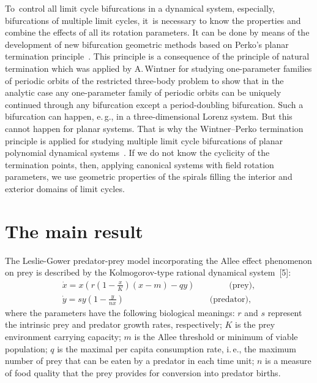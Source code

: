 \documentclass[12pt]{llncs}
\begin{document}
To~control all limit cycle bifurcations in a dynamical system,
especially, bifurcations of multiple limit cycles, it~is necessary to know the properties and
combine the effects of all its rotation parameters. It can be done by means of the development
of new bifurcation geometric methods based on Perko's planar termination principle~\cite{gaiko1}.
This principle is a consequence of the principle of natural termination which was applied
by A.\,Wintner for studying one-parameter families of periodic orbits of the restricted
three-body problem to show that in the analytic case any one-parameter family of periodic
orbits can be uniquely continued through any bifurcation except a period-doubling bifurcation.
Such a bifurcation can happen, e.\,g., in a three-dimensional Lorenz system. But this cannot
happen for planar systems. That is why the Wintner--Perko termination principle is applied
for studying multiple limit cycle bifurcations of planar polynomial dynamical
systems~\cite{gaiko1}. If we do not know the cyclicity of the termination points,
then, applying canonical systems with field rotation parameters, we use geometric
properties of the spirals filling the interior and exterior domains of limit cycles.

\section{The main result}

The Leslie-Gower predator-prey model incorporating the Allee effect phenomenon on prey
is described by the Kolmogorov-type rational dynamical system~[5]:
\begin{equation}
    \begin{array}{l}
\displaystyle\dot{x}=x\left(r\left(1-\frac{x}{K}\right)(x-m)-qy\right)
\qquad \qquad \mbox{(prey)},
    \\[4mm]
\displaystyle\dot{y}=sy\left(1-\frac{y}{nx}\right)
\qquad\qquad\qquad\qquad\qquad \mbox{(predator)},
    \end{array}
\end{equation}
where the parameters have the following biological meanings: $r$ and $s$ represent the intrinsic
prey and predator growth rates, respectively; $K$ is the prey environment carrying capacity;
$m$ is the Allee threshold or minimum of viable population; $q$ is the maximal per capita
consumption rate, i.\,e., the maximum number of prey that can be eaten by a predator in each
time unit; $n$ is a measure of food quality that the prey provides for conversion into
predator births.
\end{document}
